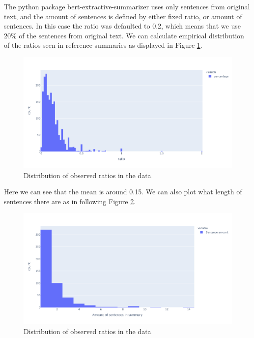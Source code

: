 \documentclass{article}
\begin{document}
\noindent
The python package bert-extractive-summarizer \cite{extractive_bert} uses only sentences from original text, and the amount of sentences is defined by either fixed ratio, or amount of sentences. In this case the ratio was defaulted to 0.2, which means that we use 20\% of the sentences from original text. We can calculate empirical distribution of the ratios seen in reference summaries as displayed in Figure \ref{fig:empirical_ratio}.


\noindent
\begin{figure}[H]
	\centering
	\hspace*{-3cm}
	\includegraphics[scale=0.55]{empirical_ratio.png}
	\caption{Distribution of observed ratios in the data}
	\label{fig:empirical_ratio}
\end{figure}

\noindent
Here we can see that the mean is around 0.15. We can also plot what length of sentences there are as in following Figure \ref{fig:empirical_lengths}.

\noindent
\begin{figure}[H]
	\centering
	\hspace*{-3cm}
	\includegraphics[scale=0.55]{empirical_lengths.png}
	\caption{Distribution of observed ratios in the data}
	\label{fig:empirical_lengths}
\end{figure}
\end{document}
